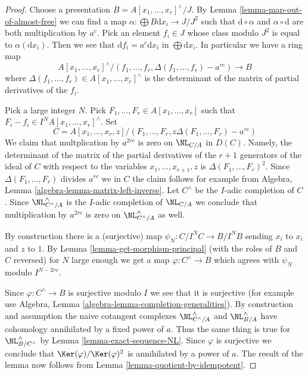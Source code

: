\begin{proof}
Choose a presentation $B = A[x_1, \ldots, x_r]^\wedge/J$.
By Lemma \ref{lemma-map-out-of-almost-free} we can find a map
$\alpha : \bigoplus B\text{d}x_i \to J/J^2$ such that
$\text{d} \circ \alpha$ and $\alpha \circ \text{d}$ are both
multiplication by $a^c$. Pick an element $f_i \in J$ whose
class modulo $J^2$ is equal to $\alpha(\text{d}x_i)$.
Then we see that $\text{d}f_i = a^c \text{d}x_i$ in $\bigoplus \text{d}x_i$.
In particular we have a ring map
$$
A[x_1, \ldots, x_r]^\wedge/
(f_1, \ldots, f_r, \Delta(f_1, \ldots, f_r) - a^{rc})
\longrightarrow B
$$
where $\Delta(f_1, \ldots, f_r) \in A[x_1, \ldots, x_r]^\wedge$
is the determinant of the matrix of partial derivatives of the $f_i$.

\medskip\noindent
Pick a large integer $N$. Pick $F_1, \ldots, F_r \in A[x_1, \ldots, x_r]$
such that $F_i - f_i \in I^NA[x_1, \ldots, x_r]^\wedge$. Set
$$
C = A[x_1, \ldots, x_r, z]/
(F_1, \ldots, F_r, z\Delta(F_1, \ldots, F_r) - a^{rc})
$$
We claim that multplication by $a^{2rc}$ is zero on $\NL_{C/A}$ in $D(C)$.
Namely, the determinant of the matrix of the partial derivatives
of the $r + 1$ generators of the ideal of $C$ with respect to the variables
$x_1, \ldots, x_{r + 1}, z$ is $\Delta(F_1, \ldots, F_r)^2$. Since
$\Delta(F_1, \ldots, F_r)$ divides $a^{rc}$ we in $C$ the
claim follows for example from
Algebra, Lemma \ref{algebra-lemma-matrix-left-inverse}.
Let $C^\wedge$ be the $I$-adic completion of $C$. Since
$\NL^\wedge_{C^\wedge/A}$ is the $I$-adic completion of $\NL_{C/A}$
we conclude that multiplication by $a^{2rc}$ is zero on
$\NL^\wedge_{C^\wedge/A}$ as well.

\medskip\noindent
By construction there is a (surjective) map $\psi_N : C/I^NC \to B/I^NB$
sending $x_i$ to $x_i$ and $z$ to $1$. By
Lemma \ref{lemma-get-morphism-principal} (with the roles of $B$ and $C$
reversed) for $N$ large enough we get a map $\varphi : C^\wedge \to B$ which
agrees with $\psi_N$ modulo $I^{N - 2rc}$.

\medskip\noindent
Since $\varphi : C^\wedge \to B$ is surjective modulo $I$ we see that it is
surjective (for example use
Algebra, Lemma \ref{algebra-lemma-completion-generalities}).
By construction and assumption the naive cotangent complexes
$\NL^\wedge_{C^\wedge/A}$ and $\NL^\wedge_{B/A}$
have cohomology annihilated by a fixed power of $a$. Thus the same thing
is true for $\NL^\wedge_{B/C^\wedge}$ by Lemma \ref{lemma-exact-sequence-NL}.
Since $\varphi$ is surjective we conclude that
$\Ker(\varphi)/\Ker(\varphi)^2$ is annihilated by a power of $a$.
The result of the lemma now follows from
Lemma \ref{lemma-quotient-by-idempotent}.
\end{proof}









